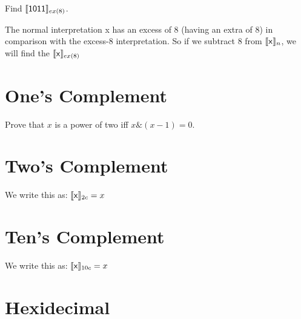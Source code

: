 \frmrule 

\begin{example}
Find $\llbracket \text{\textsf{1011}} \rrbracket_{ex(8)}$.
\end{example}


The normal interpretation \textsf{x} has an excess of 8 (having an extra of 8) 
in comparison with the excess-8 interpretation. 
So if we subtract 8 from $\llbracket \text{\textsf{x}} \rrbracket_{n}$, 
we will find the $\llbracket \text{\textsf{x}} \rrbracket_{ex(8)}$


\section{One's Complement}


Prove that $x$ is a power of two iff $x \& (x-1) = 0$.


\section{Two's Complement}

We write this as: $\llbracket \text{\textsf{x}} \rrbracket_{2c} = x$









\section{Ten's Complement}

We write this as: $\llbracket \text{\textsf{x}} \rrbracket_{10c} = x$


\section{Hexidecimal}


